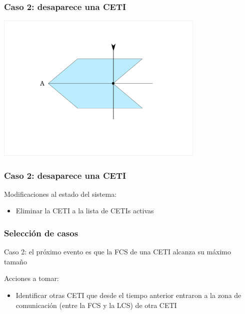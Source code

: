\documentclass[handout]{beamer}
\theoremstyle{plain}
\theoremstyle{definition}
\theoremstyle{remark}
\begin{document}
\begin{frame}\frametitle{Caso 2: desaparece una CETI}
   \centering
   \includegraphics[width=0.75\textwidth]{C2.png}
\end{frame}  %

\begin{frame}\frametitle{Caso 2: desaparece una CETI}

   Modificaciones al estado del sistema:
   \begin{itemize}
      \item Eliminar la CETI a la lista de CETIs activas
   \end{itemize}

\end{frame}  %
 

\begin{frame}\frametitle{Selección de casos}
   Caso 2: el próximo evento es que la FCS de una CETI alcanza su
   máximo tamaño

   Acciones a tomar:

   \begin{itemize}
      \item Identificar otras CETI que desde el tiempo anterior
         entraron a la zona de comunicación (entre la FCS y la LCS) de
         otra CETI
   \end{itemize}
\end{frame}

\end{document}
